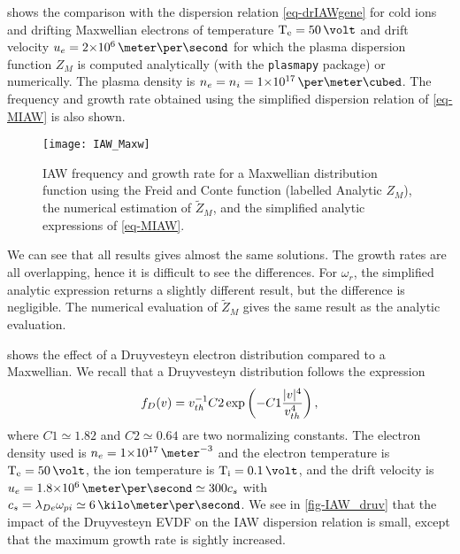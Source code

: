    shows the comparison with the dispersion relation \cref{eq-drIAWgene} for cold ions and drifting Maxwellian electrons of temperature $\Te=50\,\volt$ and drift velocity $u_e = \sn{2}{6} \,\meter\per\second$ for which the plasma dispersion function $Z_M$ is computed analytically (with the \texttt{plasmapy} package) or numerically.
  The plasma density is $n_e = n_i = \sn{1}{17} \,\per\meter\cubed$.
  The frequency and growth rate obtained using the simplified dispersion relation of \cref{eq-MIAW} is also shown. 
  
  \begin{figure}[hbt]
    \centering
    \texttt{[image: IAW\_Maxw]}
    \caption{IAW frequency and growth rate for a Maxwellian distribution function using the Freid and Conte function (labelled Analytic $Z_M$), the numerical estimation of $\tilde{Z}_M$, and the simplified analytic expressions of \cref{eq-MIAW}. }
    \label{fig-IAW_Maxw}
  \end{figure}
  
  We can see that all results gives almost the same solutions.
  The growth rates are all overlapping, hence it is difficult to see the differences.
  For $\omega_r$, the simplified analytic expression returns a slightly different result, but the difference is negligible.
  The numerical evaluation of $\tilde{Z}_M$ gives the same result as the analytic evaluation.
  
   shows the effect of a Druyvesteyn electron distribution compared to a Maxwellian.
  We recall that a Druyvesteyn distribution follows the expression
  \begin{equation} \label{eq-druyv}
    f_{D}(v) = v_{th}^{-1} C2 \exp \left( -C1 \frac{\lvert v\rvert^4}{v_{th}^4}  \right) ,
  \end{equation}
  where $C1 \simeq 1.82$ and $C2 \simeq 0.64$ are two normalizing constants.
  The electron density used is $n_e=\sn{1}{17}\,\meter^{-3}$ and the electron temperature is $\Te=50\,\volt$, the ion temperature is $\Ti=0.1\,\volt$, and the drift velocity is $u_e=\sn{1.8}{6}\,\meter\per\second \simeq 300 c_s$ with $c_s=\lde \opi\simeq 6\,\kilo\meter\per\second$.
  We see in \cref{fig-IAW_druv} that the impact of the Druyvesteyn \ac{EVDF} on the \ac{IAW} dispersion relation is small, except that the maximum growth rate is sightly increased.
  
